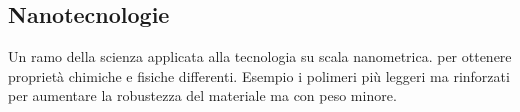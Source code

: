 \subsection{Nanotecnologie}
Un ramo della scienza applicata alla tecnologia su scala nanometrica. per ottenere proprietà chimiche e fisiche differenti. Esempio i polimeri più leggeri ma rinforzati per aumentare la robustezza del materiale ma con peso minore. 
